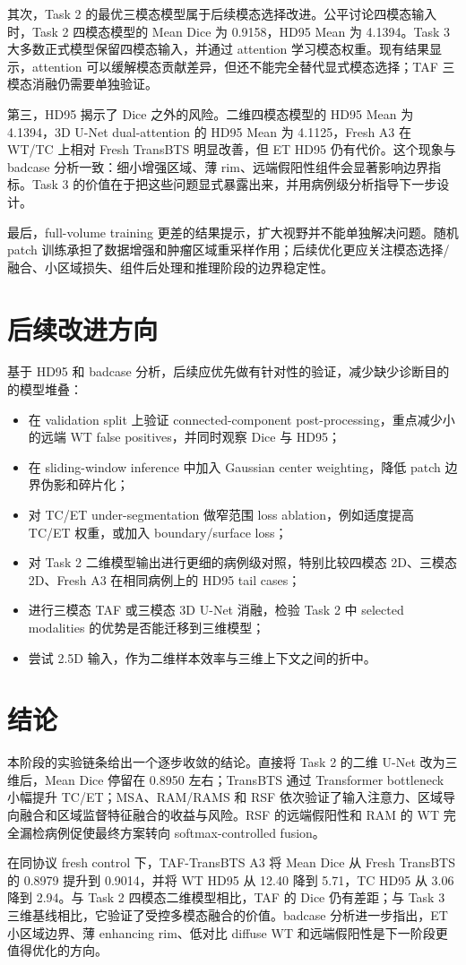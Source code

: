 \documentclass[UTF8,11pt]{ctexart}
\begin{document}
其次，Task 2 的最优三模态模型属于后续模态选择改进。公平讨论四模态输入时，Task 2 四模态模型的 Mean Dice 为 0.9158，HD95 Mean 为 4.1394。Task 3 大多数正式模型保留四模态输入，并通过 attention 学习模态权重。现有结果显示，attention 可以缓解模态贡献差异，但还不能完全替代显式模态选择；TAF 三模态消融仍需要单独验证。

第三，HD95 揭示了 Dice 之外的风险。二维四模态模型的 HD95 Mean 为 4.1394，3D U-Net dual-attention 的 HD95 Mean 为 4.1125，Fresh A3 在 WT/TC 上相对 Fresh TransBTS 明显改善，但 ET HD95 仍有代价。这个现象与 badcase 分析一致：细小增强区域、薄 rim、远端假阳性组件会显著影响边界指标。Task 3 的价值在于把这些问题显式暴露出来，并用病例级分析指导下一步设计。

最后，full-volume training 更差的结果提示，扩大视野并不能单独解决问题。随机 patch 训练承担了数据增强和肿瘤区域重采样作用；后续优化更应关注模态选择/融合、小区域损失、组件后处理和推理阶段的边界稳定性。

\section{后续改进方向}

基于 HD95 和 badcase 分析，后续应优先做有针对性的验证，减少缺少诊断目的的模型堆叠：
\begin{itemize}
  \item 在 validation split 上验证 connected-component post-processing，重点减少小的远端 WT false positives，并同时观察 Dice 与 HD95；
  \item 在 sliding-window inference 中加入 Gaussian center weighting，降低 patch 边界伪影和碎片化；
  \item 对 TC/ET under-segmentation 做窄范围 loss ablation，例如适度提高 TC/ET 权重，或加入 boundary/surface loss；
  \item 对 Task 2 二维模型输出进行更细的病例级对照，特别比较四模态 2D、三模态 2D、Fresh A3 在相同病例上的 HD95 tail cases；
  \item 进行三模态 TAF 或三模态 3D U-Net 消融，检验 Task 2 中 selected modalities 的优势是否能迁移到三维模型；
  \item 尝试 2.5D 输入，作为二维样本效率与三维上下文之间的折中。
\end{itemize}

\section{结论}

本阶段的实验链条给出一个逐步收敛的结论。直接将 Task 2 的二维 U-Net 改为三维后，Mean Dice 停留在 0.8950 左右；TransBTS 通过 Transformer bottleneck 小幅提升 TC/ET；MSA、RAM/RAMS 和 RSF 依次验证了输入注意力、区域导向融合和区域监督特征融合的收益与风险。RSF 的远端假阳性和 RAM 的 WT 完全漏检病例促使最终方案转向 softmax-controlled fusion。

在同协议 fresh control 下，TAF-TransBTS A3 将 Mean Dice 从 Fresh TransBTS 的 0.8979 提升到 0.9014，并将 WT HD95 从 12.40 降到 5.71，TC HD95 从 3.06 降到 2.94。与 Task 2 四模态二维模型相比，TAF 的 Dice 仍有差距；与 Task 3 三维基线相比，它验证了受控多模态融合的价值。badcase 分析进一步指出，ET 小区域边界、薄 enhancing rim、低对比 diffuse WT 和远端假阳性是下一阶段更值得优化的方向。
\end{document}
